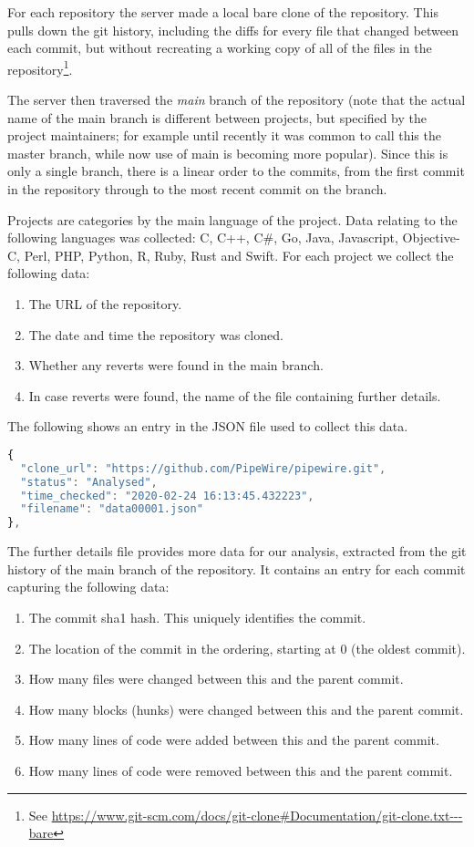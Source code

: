 \documentclass[10pt,journal,compsoc]{IEEEtran}
\begin{document}
For each repository the server made a local bare clone of the repository. This pulls down the git history, including the diffs for every file that changed between each commit, but without recreating a working copy of all of the files in the repository\footnote{See \url{https://www.git-scm.com/docs/git-clone#Documentation/git-clone.txt---bare}}.

The server then traversed the {\it main\/} branch of the repository (note that the actual name of the main branch is different between projects, but specified by the project maintainers; for example until recently it was common to call this the {\code master} branch, while now use of {\code main} is becoming more popular). Since this is only a single branch, there is a linear order to the commits, from the first commit in the repository through to the most recent commit on the branch.

Projects are categories by the main language of the project. Data relating to the following languages was collected: C, C++, C\#, Go, Java, Javascript, Objective-C, Perl, PHP, Python, R, Ruby, Rust and Swift. For each project we collect the following data:

\begin{enumerate}
\item The URL of the repository.
\item The date and time the repository was cloned.
\item Whether any reverts were found in the main branch.
\item In case reverts were found, the name of the file containing further details.
\end{enumerate}

The following shows an entry in the JSON file used to collect this data.

\begin{lstlisting}[language=JavaScript]
{
  "clone_url": "https://github.com/PipeWire/pipewire.git",
  "status": "Analysed",
  "time_checked": "2020-02-24 16:13:45.432223",
  "filename": "data00001.json"
},
\end{lstlisting}

The further details file provides more data for our analysis, extracted from the git history of the main branch of the repository. It contains an entry for each commit capturing the following data:

\begin{enumerate}
\item The commit sha1 hash. This uniquely identifies the commit.
\item The location of the commit in the ordering, starting at 0 (the oldest commit).
\item How many files were changed between this and the parent commit.
\item How many blocks (hunks) were changed between this and the parent commit.
\item How many lines of code were added between this and the parent commit.
\item How many lines of code were removed between this and the parent commit.
\end{enumerate}
\end{document}
